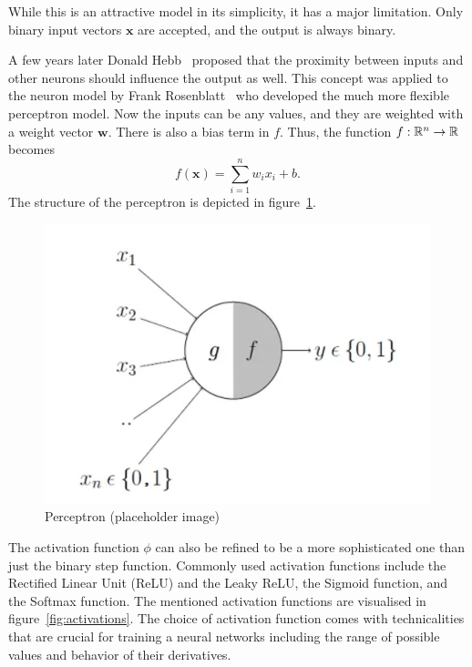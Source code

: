 While this is an attractive model in its simplicity, it has a major limitation.
Only binary input vectors $\mathbf{x}$ are accepted, and the output is always binary.

A few years later Donald Hebb~\cite{hebb} proposed that the proximity between inputs and other neurons should influence the output as well.
This concept was applied to the neuron model by Frank Rosenblatt~\cite{rosenblatt} who developed the much more flexible perceptron model.
Now the inputs can be any values, and they are weighted with a weight vector $\bm{w}$.
There is also a bias term in $f$.
Thus, the function $f : \mathbb{R}^n \rightarrow \mathbb{R}$ becomes
\begin{equation}
    f(\mathbf{x}) = \sum_{i=1}^{n} w_{i} x_{i} + b.
\end{equation}
The structure of the perceptron is depicted in figure~\ref{fig:perceptron}.

\begin{figure}\label{fig:perceptron}
    \includegraphics{background/fig/mccullochpitts.png}
    \caption{Perceptron (placeholder image)}
\end{figure}

The activation function $\phi$ can also be refined to be a more sophisticated one than just the binary step function.
Commonly used activation functions include the Rectified Linear Unit (ReLU) and the Leaky ReLU, the Sigmoid function, and the Softmax function.
The mentioned activation functions are visualised in figure~\ref{fig:activations}.
The choice of activation function comes with technicalities that are crucial for training a neural networks including the range of possible values and behavior of their derivatives.

